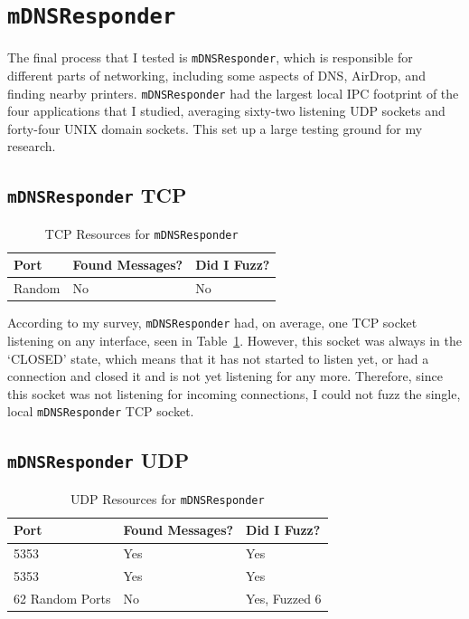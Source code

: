\section{\texttt{mDNSResponder}}
\label{sec:mdns}
The final process that I tested is \texttt{mDNSResponder}, which is responsible for different parts of networking, including some aspects of DNS, AirDrop, and finding nearby printers.  \texttt{mDNSResponder} had the largest local IPC footprint of the four applications that I studied, averaging sixty-two listening UDP sockets and forty-four UNIX domain sockets.  This set up a large testing ground for my research.

\subsection{\texttt{mDNSResponder} TCP}
\label{sec:mdnsTcp}

\begin{table}
\centering
\begin{normalsize}
\begin{tabular}{ l | l | l }
\textbf{Port} & \textbf{Found Messages?} & \textbf{Did I Fuzz?} \\ \hline
Random & No & No \\ \hline
\end{tabular}
\caption{TCP Resources for \texttt{mDNSResponder}}
\label{tab:mdnsTcpTab}
\end{normalsize}
\end{table} 

According to my survey, \texttt{mDNSResponder} had, on average, one TCP socket listening on any interface, seen in Table~\ref{tab:mdnsTcpTab}.  However, this socket was always in the `CLOSED' state, which means that it has not started to listen yet, or had a connection and closed it and is not yet listening for any more.  Therefore, since this socket was not listening for incoming connections, I could not fuzz the single, local \texttt{mDNSResponder} TCP socket.

\subsection{\texttt{mDNSResponder} UDP}
\label{sec:mdnsUdp}

\begin{table}
\centering
\begin{normalsize}
\begin{tabular}{ l | l | l }
\textbf{Port} & \textbf{Found Messages?} & \textbf{Did I Fuzz?} \\ \hline
5353 & Yes & Yes \\ \hline
5353 & Yes & Yes \\ \hline
62 Random Ports & No & Yes, Fuzzed 6 \\ \hline
\end{tabular}
\caption{UDP Resources for \texttt{mDNSResponder}}
\label{tab:mdnsUdpTab}
\end{normalsize}
\end{table} 

